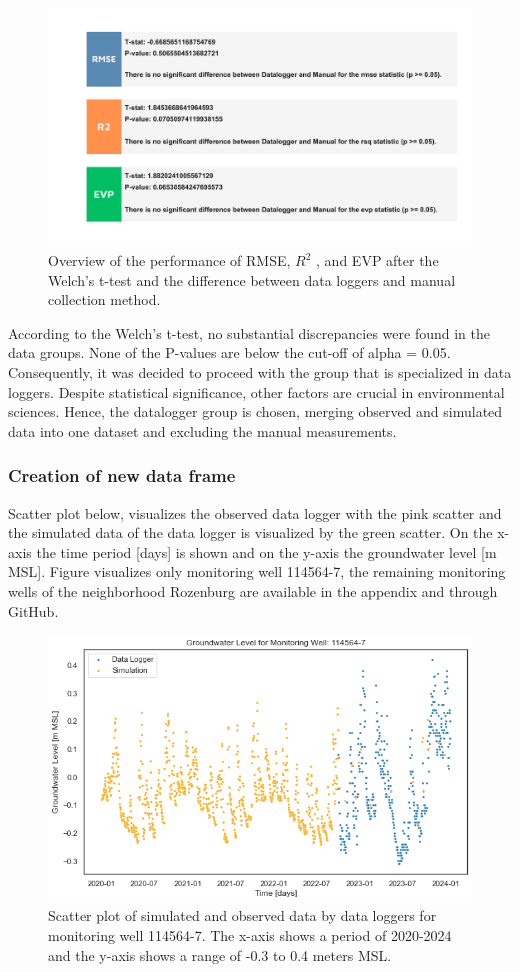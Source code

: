 \begin{figure}[htbp]
    \centering
    \includegraphics[width=0.80\linewidth]{frontmatter/Rozenburg-fig/rozstat.pdf}
    \caption{Overview of the performance of RMSE, $R^2$ , and EVP after the Welch's t-test and the difference between data loggers and manual collection method. }
    \label{welch}
\end{figure}
\newpage
According to the Welch's t-test, no substantial discrepancies were found in the data groups. None of the P-values are below the cut-off of alpha = 0.05. Consequently, it was decided to proceed with the group that is specialized in data loggers. Despite statistical significance, other factors are crucial in environmental sciences. Hence, the datalogger group is chosen, merging observed and simulated data into one dataset and excluding the manual measurements. 

\subsubsection{Creation of new data frame}
Scatter plot  below, visualizes the observed data logger with the pink scatter and the simulated data of the data logger is visualized by the green scatter. On the x-axis the time period [days] is shown and on the y-axis the groundwater level [m MSL]. Figure  visualizes only monitoring well 114564-7, the remaining monitoring wells of the neighborhood Rozenburg are available in the appendix and through GitHub.

\begin{figure}[htbp]
    \centering
    \includegraphics[width=0.80\linewidth]{frontmatter/Rozenburg-fig/scatterpastasex.png}
    \caption{Scatter plot of simulated and observed data by data loggers for monitoring well 114564-7. The x-axis shows a period of 2020-2024 and the y-axis shows a range of -0.3 to 0.4 meters MSL. }
    \label{scatter}
\end{figure}


